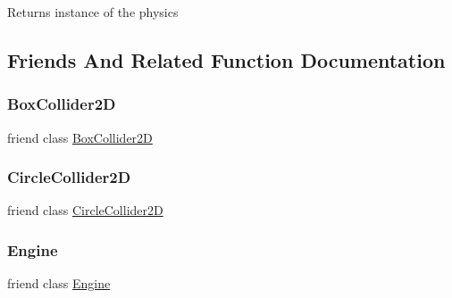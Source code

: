 \begin{DoxyReturn}{Returns}
instance of the physics 
\end{DoxyReturn}


\subsection{Friends And Related Function Documentation}
\hypertarget{class_mason_1_1_physics_ae5e915b753caa5273de73badf505458f}{}\label{class_mason_1_1_physics_ae5e915b753caa5273de73badf505458f} 
\subsubsection{\texorpdfstring{Box\+Collider2D}{BoxCollider2D}}
{\footnotesize\ttfamily friend class \hyperlink{class_mason_1_1_box_collider2_d}{Box\+Collider2D}\hspace{0.3cm}{\ttfamily [friend]}}

\hypertarget{class_mason_1_1_physics_a55094363fa44c6fe8cccbd7213309403}{}\label{class_mason_1_1_physics_a55094363fa44c6fe8cccbd7213309403} 
\subsubsection{\texorpdfstring{Circle\+Collider2D}{CircleCollider2D}}
{\footnotesize\ttfamily friend class \hyperlink{class_mason_1_1_circle_collider2_d}{Circle\+Collider2D}\hspace{0.3cm}{\ttfamily [friend]}}

\hypertarget{class_mason_1_1_physics_a3e1914489e4bed4f9f23cdeab34a43dc}{}\label{class_mason_1_1_physics_a3e1914489e4bed4f9f23cdeab34a43dc} 
\subsubsection{\texorpdfstring{Engine}{Engine}}
{\footnotesize\ttfamily friend class \hyperlink{class_mason_1_1_engine}{Engine}\hspace{0.3cm}{\ttfamily [friend]}}

\hypertarget{class_mason_1_1_physics_a60dcb177f208afef9864b04ec483a960}{}\label{class_mason_1_1_physics_a60dcb177f208afef9864b04ec483a960} 

